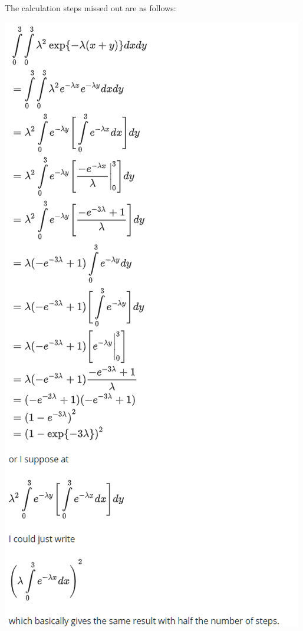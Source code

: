 \documentclass[]{book}
\theoremstyle{definition}
\theoremstyle{definition}
\theoremstyle{definition}
\theoremstyle{remark}
\begin{document}
The calculation steps missed out are as follows:

\includegraphics[width=1\linewidth]{images/headachesteps}
\end{document}
